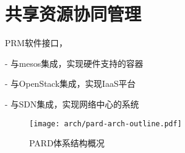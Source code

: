 

\chapter{共享资源协同管理}
\label{chap:parddc}

PRM软件接口，

- 与mesos集成，实现硬件支持的容器

- 与OpenStack集成，实现IaaS平台

- 与SDN集成，实现网络中心的系统

\begin{figure}[tbh]
  \centering
  \texttt{[image: arch/pard-arch-outline.pdf]}
  \caption[PARD体系结构概况]{PARD体系结构概况}
  \label{fig:pard-arch-outline}
\end{figure}

